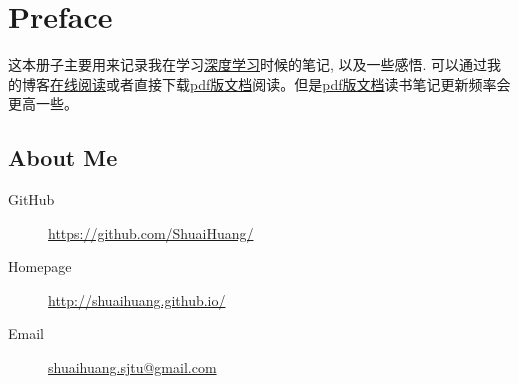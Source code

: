 \chapter*{Preface}

这本册子主要用来记录我在学习\href{http://www.deeplearningbook.org/)}{深度学习}时候的笔记, 以及一些感悟. 可以通过我的博客\href{http://shuaihuang.github.io/Notes/}{在线阅读}或者直接下载\href{https://github.com/ShuaiHuang/DeepLearningNotes/blob/master/Deep-Learning-Reading-Note.pdf}{pdf版文档}阅读。但是\href{https://github.com/ShuaiHuang/DeepLearningNotes/blob/master/Deep-Learning-Reading-Note.pdf}{pdf版文档}读书笔记更新频率会更高一些。

\section*{About Me}

\begin{description}
    \item[GitHub] \href{https://github.com/ShuaiHuang/}{https://github.com/ShuaiHuang/}
    \item[Homepage] \href{http://shuaihuang.github.io/}{http://shuaihuang.github.io/}
    \item[Email] \href{mailto:shuaihuang.sjtu@gmail.com}{shuaihuang.sjtu@gmail.com}
\end{description}